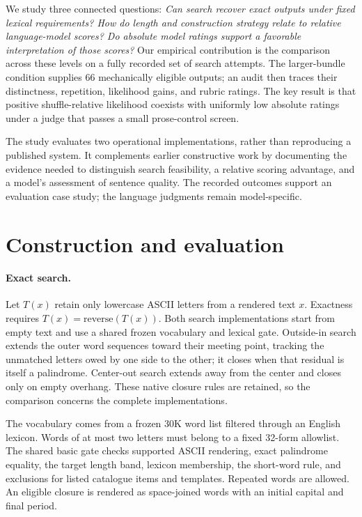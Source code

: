 \documentclass[11pt]{article}
\begin{document}
We study three connected questions: \emph{Can search recover exact outputs under fixed lexical requirements? How do length and construction strategy relate to relative language-model scores? Do absolute model ratings support a favorable interpretation of those scores?} Our empirical contribution is the comparison across these levels on a fully recorded set of search attempts. The larger-bundle condition supplies 66 mechanically eligible outputs; an audit then traces their distinctness, repetition, likelihood gains, and rubric ratings. The key result is that positive shuffle-relative likelihood coexists with uniformly low absolute ratings under a judge that passes a small prose-control screen.

The study evaluates two operational implementations, rather than reproducing a published system. It complements earlier constructive work by documenting the evidence needed to distinguish search feasibility, a relative scoring advantage, and a model's assessment of sentence quality. The recorded outcomes support an evaluation case study; the language judgments remain model-specific.

\section{Construction and evaluation}

\paragraph{Exact search.}
Let $T(x)$ retain only lowercase ASCII letters from a rendered text $x$. Exactness requires $T(x)=\mathrm{reverse}(T(x))$. Both search implementations start from empty text and use a shared frozen vocabulary and lexical gate. Outside-in search extends the outer word sequences toward their meeting point, tracking the unmatched letters owed by one side to the other; it closes when that residual is itself a palindrome. Center-out search extends away from the center and closes only on empty overhang. These native closure rules are retained, so the comparison concerns the complete implementations.

The vocabulary comes from a frozen 30K word list filtered through an English lexicon. Words of at most two letters must belong to a fixed 32-form allowlist. The shared basic gate checks supported ASCII rendering, exact palindrome equality, the target length band, lexicon membership, the short-word rule, and exclusions for listed catalogue items and templates. Repeated words are allowed. An eligible closure is rendered as space-joined words with an initial capital and final period.
\end{document}
